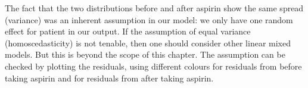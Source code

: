 \documentclass[]{book}\usepackage[]{graphicx}\usepackage[]{color}
\begin{document}
The fact that the two distributions before and after aspirin show the same spread (variance) was an inherent assumption in our model: we only have one random effect for patient in our output. If the assumption of equal variance (homoscedasticity) is not tenable, then one should consider other linear mixed models. But this is beyond the scope of this chapter. The assumption can be checked by plotting the residuals, using different colours for residuals from before taking aspirin and for residuals from after taking aspirin. 



% 
% 
% 
% 
\end{document}
